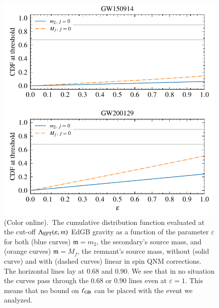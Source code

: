 \documentclass[twocolumn,prd,aps,superscriptaddress,preprintnumbers,tightenlines,showpacs,nofootinbib,amsfonts,amsmath,longbibliography]{revtex4-1}
\newcommand{\gm}{\mathfrak{m}}
\begin{document}
\begin{figure}[t]
\includegraphics[width=\columnwidth]{figs/edgb_cdf_varying_threshold.pdf}
\caption{(Color online).~The cumulative distribution function evaluated at the
cut-off $\Lambda_{\rm EFT}(\varepsilon,\gm)$ EdGB gravity as a function of the parameter
$\varepsilon$ for both (blue curves) $\gm = m_2$, the secondary's source
mass, and (orange curves) $\gm = M_{f}$, the remnant's source mass, without
(solid curve) and with (dashed curves) linear in spin QNM corrections. The
horizontal lines lay at 0.68 and 0.90. We see that in no situation the curves pass
through the 0.68 or 0.90 lines even at $\varepsilon = 1$. This means that no bound on $\ell_{\rm GB}$
can be placed with the event we analyzed.
}
\label{fig:dcs_cdf}
\end{figure}
\end{document}
